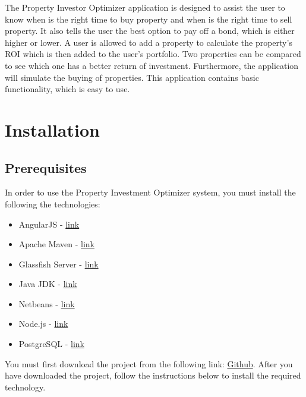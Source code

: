 \documentclass[a4paper,12pt]{article}
\begin{document}
The Property Investor Optimizer application is designed to assist the user to know when is the right time to buy property and when is the right time to sell property. It also tells the user the best option to pay off a bond, which is either higher or lower. A user is allowed to add a property to calculate the property's ROI which is then added to the user's portfolio. Two properties can be compared to see which one has a better return of investment. Furthermore, the application will simulate the buying of properties. This application contains basic functionality, which is easy to use.
\section{Installation}

\subsection{Prerequisites}
In order to use the Property Investment Optimizer system, you must install the following the technologies:
\begin{itemize}
\item{AngularJS - \href{https://angularjs.org/}{link}}
\item{Apache Maven - \href{https://maven.apache.org/download.cgi}{link}}
\item{Glassfish Server - \href{https://glassfish.java.net/download.html}{link}}
\item{Java JDK - \href{http://www.oracle.com/technetwork/java/javase/downloads/index.html}{link}}
\item{Netbeans - \href{https://netbeans.org/downloads/}{link}}
\item{Node.js - \href{https://nodejs.org/en/download/}{link}}
\item{PostgreSQL - \href{https://www.postgresql.org/download/}{link}}
\end{itemize}
You must first download the project from the following link: \href{https://github.com/u13278012/IMPAKD}{Github}. After you have downloaded the project, follow the instructions below to install the required technology.


\newpage
\end{document}
